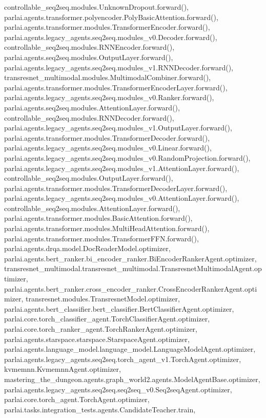 controllable\+\_\+seq2seq.\+modules.\+Unknown\+Dropout.\+forward(), parlai.\+agents.\+transformer.\+polyencoder.\+Poly\+Basic\+Attention.\+forward(), parlai.\+agents.\+transformer.\+modules.\+Transformer\+Encoder.\+forward(), parlai.\+agents.\+legacy\+\_\+agents.\+seq2seq.\+modules\+\_\+v0.\+Decoder.\+forward(), controllable\+\_\+seq2seq.\+modules.\+R\+N\+N\+Encoder.\+forward(), parlai.\+agents.\+seq2seq.\+modules.\+Output\+Layer.\+forward(), parlai.\+agents.\+legacy\+\_\+agents.\+seq2seq.\+modules\+\_\+v1.\+R\+N\+N\+Decoder.\+forward(), transresnet\+\_\+multimodal.\+modules.\+Multimodal\+Combiner.\+forward(), parlai.\+agents.\+transformer.\+modules.\+Transformer\+Encoder\+Layer.\+forward(), parlai.\+agents.\+legacy\+\_\+agents.\+seq2seq.\+modules\+\_\+v0.\+Ranker.\+forward(), parlai.\+agents.\+seq2seq.\+modules.\+Attention\+Layer.\+forward(), controllable\+\_\+seq2seq.\+modules.\+R\+N\+N\+Decoder.\+forward(), parlai.\+agents.\+legacy\+\_\+agents.\+seq2seq.\+modules\+\_\+v1.\+Output\+Layer.\+forward(), parlai.\+agents.\+transformer.\+modules.\+Transformer\+Decoder.\+forward(), parlai.\+agents.\+legacy\+\_\+agents.\+seq2seq.\+modules\+\_\+v0.\+Linear.\+forward(), parlai.\+agents.\+legacy\+\_\+agents.\+seq2seq.\+modules\+\_\+v0.\+Random\+Projection.\+forward(), parlai.\+agents.\+legacy\+\_\+agents.\+seq2seq.\+modules\+\_\+v1.\+Attention\+Layer.\+forward(), controllable\+\_\+seq2seq.\+modules.\+Output\+Layer.\+forward(), parlai.\+agents.\+transformer.\+modules.\+Transformer\+Decoder\+Layer.\+forward(), parlai.\+agents.\+legacy\+\_\+agents.\+seq2seq.\+modules\+\_\+v0.\+Attention\+Layer.\+forward(), controllable\+\_\+seq2seq.\+modules.\+Attention\+Layer.\+forward(), parlai.\+agents.\+transformer.\+modules.\+Basic\+Attention.\+forward(), parlai.\+agents.\+transformer.\+modules.\+Multi\+Head\+Attention.\+forward(), parlai.\+agents.\+transformer.\+modules.\+Transformer\+F\+F\+N.\+forward(), parlai.\+agents.\+drqa.\+model.\+Doc\+Reader\+Model.\+optimizer, parlai.\+agents.\+bert\+\_\+ranker.\+bi\+\_\+encoder\+\_\+ranker.\+Bi\+Encoder\+Ranker\+Agent.\+optimizer, transresnet\+\_\+multimodal.\+transresnet\+\_\+multimodal.\+Transresnet\+Multimodal\+Agent.\+optimizer, parlai.\+agents.\+bert\+\_\+ranker.\+cross\+\_\+encoder\+\_\+ranker.\+Cross\+Encoder\+Ranker\+Agent.\+optimizer, transresnet.\+modules.\+Transresnet\+Model.\+optimizer, parlai.\+agents.\+bert\+\_\+classifier.\+bert\+\_\+classifier.\+Bert\+Classifier\+Agent.\+optimizer, parlai.\+core.\+torch\+\_\+classifier\+\_\+agent.\+Torch\+Classifier\+Agent.\+optimizer, parlai.\+core.\+torch\+\_\+ranker\+\_\+agent.\+Torch\+Ranker\+Agent.\+optimizer, parlai.\+agents.\+starspace.\+starspace.\+Starspace\+Agent.\+optimizer, parlai.\+agents.\+language\+\_\+model.\+language\+\_\+model.\+Language\+Model\+Agent.\+optimizer, parlai.\+agents.\+legacy\+\_\+agents.\+seq2seq.\+torch\+\_\+agent\+\_\+v1.\+Torch\+Agent.\+optimizer, kvmemnn.\+Kvmemnn\+Agent.\+optimizer, mastering\+\_\+the\+\_\+dungeon.\+agents.\+graph\+\_\+world2.\+agents.\+Model\+Agent\+Base.\+optimizer, parlai.\+agents.\+legacy\+\_\+agents.\+seq2seq.\+seq2seq\+\_\+v0.\+Seq2seq\+Agent.\+optimizer, parlai.\+core.\+torch\+\_\+agent.\+Torch\+Agent.\+optimizer, parlai.\+tasks.\+integration\+\_\+tests.\+agents.\+Candidate\+Teacher.\+train, 